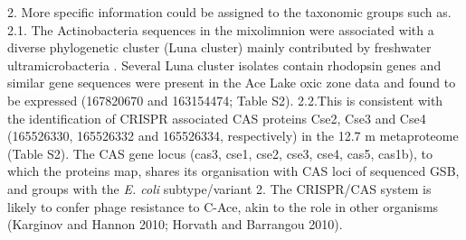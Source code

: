 2. More specific information could be assigned to the taxonomic groups such as.
2.1. The Actinobacteria sequences in the mixolimnion were associated with a diverse phylogenetic cluster (Luna cluster) mainly contributed by freshwater ultramicrobacteria \cite{Hahn2003}. 
Several Luna cluster isolates contain rhodopsin genes \cite{Sharma2009} and similar gene sequences were present in the Ace Lake oxic zone data and found to be expressed (167820670 and 163154474; Table S2).
2.2.This is consistent with the identification of \ac{CRISPR} associated \ac{CAS} proteins Cse2, Cse3 and Cse4 (165526330, 165526332 and 165526334, respectively) in the 12.7 m metaproteome (Table S2). 
The \ac{CAS} gene locus (cas3, cse1, cse2, cse3, cse4, cas5, cas1b), to which the proteins map, shares its organisation with \ac{CAS} loci of sequenced \ac{GSB}, and groups with the \emph{E. coli} subtype/variant 2. The \ac{CRISPR}/\ac{CAS} system is likely to confer phage resistance to C-Ace, akin to the role in other organisms (Karginov and Hannon 2010; Horvath and Barrangou 2010).

